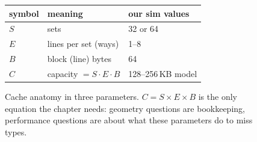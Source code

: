 \begin{figure}[htbp]
\centering
\begin{tabular}{lll}
\toprule
symbol & meaning & our sim values \\
\midrule
$S$ & sets          & 32 or 64 \\
$E$ & lines per set (ways) & 1--8 \\
$B$ & block (line) bytes   & 64 \\
\midrule
$C$ & capacity $=S\cdot E\cdot B$ & 128--256\,KB model \\
\bottomrule
\end{tabular}
\caption{Cache anatomy in three parameters. $C=S\times E\times B$ is
the only equation the chapter needs: geometry questions are
bookkeeping, performance questions are about what these parameters
do to miss types.}
\label{fig:anatomy10}
\end{figure}
